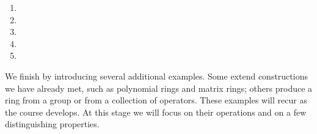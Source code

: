\documentclass[Notebook.tex]{subfiles}
\begin{document}
\begin{solution}
	\bbni
	\begin{enumerate}[label=(\alph*),ref=\theenumi\alph*]
		\item
		\item
		\item
		\item
		\item
	\end{enumerate}
\end{solution}

\newpage

We finish by introducing several additional examples. Some extend constructions we have already met, such as polynomial rings and matrix rings; others produce a ring from a group or from a collection of operators. These examples will recur as the course develops. At this stage we will focus on their operations and on a few distinguishing properties.
\end{document}
